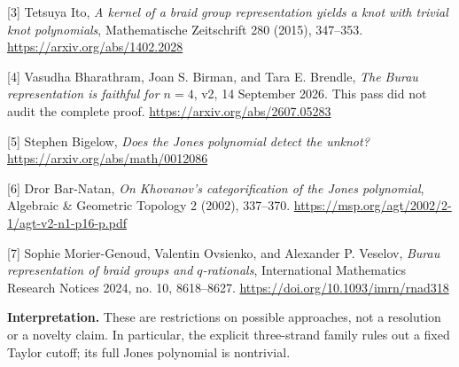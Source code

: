 \documentclass[10pt]{article}
\begin{document}
[3] Tetsuya Ito, \emph{A kernel of a braid group representation yields a knot with
trivial knot polynomials}, Mathematische Zeitschrift 280 (2015), 347--353.
\url{https://arxiv.org/abs/1402.2028}

[4] Vasudha Bharathram, Joan S. Birman, and Tara E. Brendle,
\emph{The Burau representation is faithful for \(n=4\)}, v2, 14 September 2026.
This pass did not audit the complete proof.
\url{https://arxiv.org/abs/2607.05283}

[5] Stephen Bigelow, \emph{Does the Jones polynomial detect the unknot?}
\url{https://arxiv.org/abs/math/0012086}

[6] Dror Bar-Natan, \emph{On Khovanov's categorification of the Jones polynomial},
Algebraic \& Geometric Topology 2 (2002), 337--370.
\url{https://msp.org/agt/2002/2-1/agt-v2-n1-p16-p.pdf}

[7] Sophie Morier-Genoud, Valentin Ovsienko, and Alexander P. Veselov,
\emph{Burau representation of braid groups and \(q\)-rationals},
International Mathematics Research Notices 2024, no. 10, 8618--8627.
\url{https://doi.org/10.1093/imrn/rnad318}

\textbf{Interpretation.} These are restrictions on possible approaches, not a
resolution or a novelty claim. In particular, the explicit three-strand family
rules out a fixed Taylor cutoff; its full Jones polynomial is nontrivial.
\end{document}
